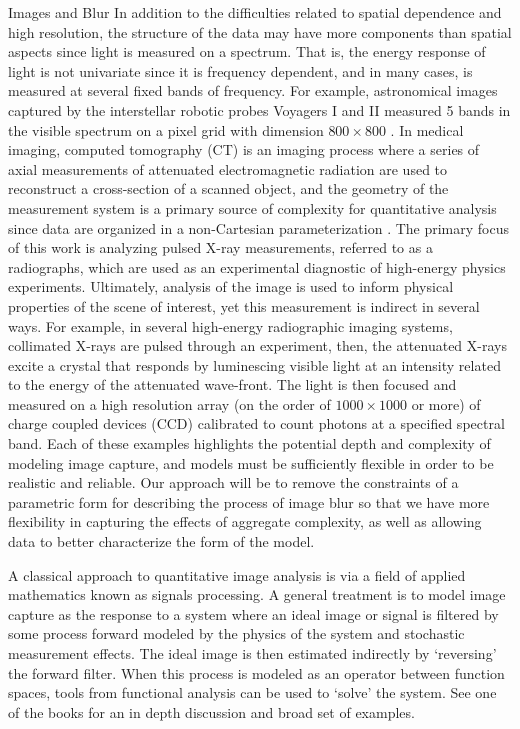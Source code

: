 \begin{chapter}{Images and Blur}
  In addition to the difficulties related to spatial dependence and high resolution, the structure of the data may have more components than spatial aspects since light is measured on a spectrum.
  That is, the energy response of light is not univariate since it is frequency dependent, and in many cases, is measured at several fixed bands of frequency.
  For example, astronomical images captured by the interstellar robotic probes Voyagers I and II measured 5 bands in the visible spectrum on a pixel grid with dimension $800 \times 800$ \citep{voyager}.
  In medical imaging, computed tomography (CT) is an imaging process where a series of axial measurements of attenuated electromagnetic radiation are used to reconstruct a cross-section of a scanned object, and the geometry of the measurement system is a primary source of complexity for quantitative analysis since data are organized in a non-Cartesian parameterization \citep{epstein2008}.
  The primary focus of this work is analyzing pulsed X-ray measurements, referred to as a radiographs, which are used as an experimental diagnostic of high-energy physics experiments.  
  Ultimately, analysis of the image is used to inform physical properties of the scene of interest, yet this measurement is indirect in several ways. 
  For example, in several high-energy radiographic imaging systems, collimated X-rays are pulsed through an experiment, then, the attenuated X-rays excite a crystal that responds by luminescing visible light at an intensity related to the energy of the attenuated wave-front.  
  The light is then focused and measured on a high resolution array (on the order of $1000\times1000$ or more) of charge coupled devices (CCD) calibrated to count photons at a specified spectral band.
  Each of these examples highlights the potential depth and complexity of modeling image capture, and models must be sufficiently flexible in order to be realistic and reliable.
  Our approach will be to remove the constraints of a parametric form for describing the process of image blur so that we have more flexibility in capturing the effects of aggregate complexity, as well as allowing data to better characterize the form of the model. 

A classical approach to quantitative image analysis is via a field of applied mathematics known as signals processing.
A general treatment is to model image capture as the response to a system where an ideal image or signal is filtered by some process forward modeled by the physics of the system and stochastic measurement effects. %
The ideal image is then estimated indirectly by `reversing' the forward filter. 
When this process is modeled as an operator between function spaces, tools from functional analysis can be used to `solve' the system.
See one of the books \citep{vogel2002,epstein2008} for an in depth discussion and broad set of examples.


\end{chapter}
